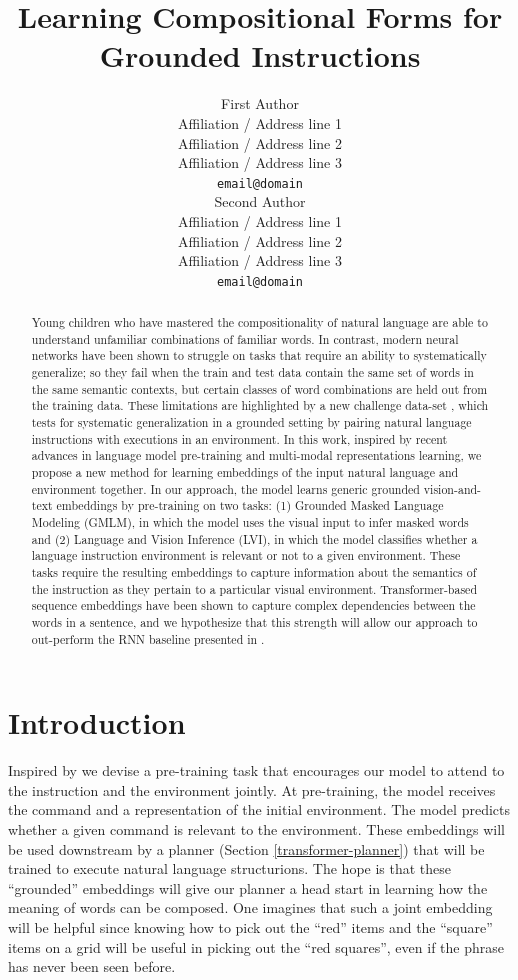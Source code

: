 \documentclass[11pt]{article}
\title{Learning Compositional Forms for Grounded Instructions}
\author{First Author \\
  Affiliation / Address line 1 \\
  Affiliation / Address line 2 \\
  Affiliation / Address line 3 \\
  \texttt{email@domain} \\\And
  Second Author \\
  Affiliation / Address line 1 \\
  Affiliation / Address line 2 \\
  Affiliation / Address line 3 \\
  \texttt{email@domain} \\}
\begin{document}
\maketitle
\begin{abstract}
Young children who have mastered the compositionality of natural language are able to understand unfamiliar combinations of familiar words. 
%
In contrast, modern neural networks have been shown to struggle on tasks that require an ability to systematically generalize; so they fail when the train and test data contain the same set of words in the same semantic contexts, but certain classes of word combinations are held out from the training data.
%
These limitations are highlighted by a new challenge data-set \cite{ruis2020benchmark}, which tests for systematic generalization in a grounded setting by pairing natural language instructions  with executions in an environment. 
%
In this work, inspired by recent advances in language model pre-training \cite{devlin-etal-2019-bert} and multi-modal representations learning, we propose a new method for learning embeddings of the input natural language and environment together.
%
In our approach, the model learns generic grounded vision-and-text embeddings by pre-training on two tasks: (1) Grounded Masked Language Modeling (GMLM), in which the model uses  the visual input to infer masked words and (2) Language and Vision Inference (LVI), in which the model classifies whether a language instruction environment is relevant or not to a given environment.
%
These tasks require the resulting embeddings to capture information about the semantics of the instruction as they pertain to a particular visual environment.
%
Transformer-based sequence embeddings have been shown to capture complex dependencies between the words in a sentence, and we hypothesize that this strength will allow our approach to out-perform the RNN baseline presented in \cite{ruis2020benchmark}.
\end{abstract}

\section{Introduction}
Inspired by \cite{Lu2019ViLBERTPT} we devise a pre-training task that encourages our model to attend to the instruction and the environment jointly. 
%
At pre-training, the model receives the command and a representation of the initial environment. 
%
The model predicts whether a given command is relevant to the environment.
%
These embeddings will be used downstream by a planner (Section \ref{transformer-planner}) that will be trained to execute natural language structurions.
%
The hope is that these ``grounded'' embeddings will give our planner a head start in learning how the meaning of words can be composed.
%
One imagines that such a joint embedding will be helpful since knowing how to pick out the ``red'' items and the ``square''  items on a grid will be useful in picking out the ``red squares'', even if the phrase has never been seen before.
\end{document}
